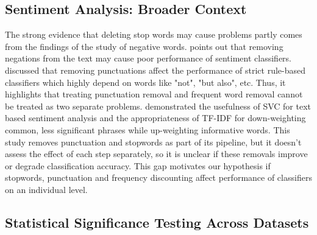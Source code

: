 \documentclass[a4paper,10pt]{article}
\begin{document}
\subsection{Sentiment Analysis: Broader Context}
The strong evidence that deleting stop words may cause problems partly comes from the findings of the study of negative words. \citet{wiegand2010survey} points out that removing negations from the text may cause poor performance of sentiment classifiers. \citet{councill2010great} discussed that removing punctuations affect the performance of strict rule-based classifiers which highly depend on words like "not", "but also", etc. Thus, it highlights that treating punctuation removal and frequent word removal cannot be treated as two separate problems. 
\citet{kumar2025sentiment} demonstrated the usefulness of SVC for text based sentiment analysis and the appropriateness of TF-IDF for down-weighting common, less significant phrases while up-weighting informative words. This study removes punctuation and stopwords as part of its pipeline, but it doesn't assess the effect of each step separately, so it is unclear if these removals improve or degrade classification accuracy. This gap motivates our hypothesis if stopwords, punctuation and frequency discounting affect performance of classifiers on an individual level.
\subsection{Statistical Significance Testing Across Datasets}
\end{document}
